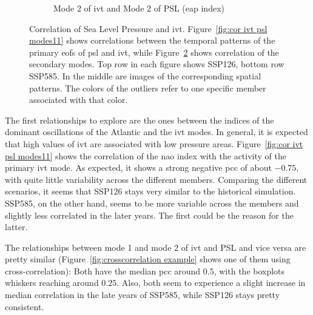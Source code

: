 \begin{figure}[!htbp]
\begin{subfigure}[b]{0.95\textwidth}
    \caption{Mode 2 of \ac{ivt} and Mode 2 of PSL (\ac{eap} index)}
    \label{fig:cor ivt psl modes22}
  \end{subfigure}
  \caption[Correlation Boxplots of PSL and IVT EOF Modes]{Correlation of Sea Level Pressure and \ac{ivt}. Figure~\ref{fig:cor ivt psl modes11} shows correlations between the temporal patterns of the primary \acp{eof} of \ac{psl} and \ac{ivt}, while Figure~\ref{fig:cor ivt psl modes22} shows correlation of the secondary modes. Top row in each figure shows SSP126, bottom row SSP585. In the middle are images of the corresponding spatial patterns. The colors of the outliers refer to one specific member associated with that color.}
\end{figure}

The first relationships to explore are the ones between the indices of the dominant oscillations of the Atlantic and the \ac{ivt} modes. 
In general, it is expected that high values of \ac{ivt} are associated with low pressure areas.
Figure~\ref{fig:cor ivt psl modes11} shows the correlation of the \ac{nao} index with the activity of the primary \ac{ivt} mode. 
As expected, it shows a strong negative \ac{pcc} of about $-0.75$, with quite little variability across the different members. 
Comparing the different scenarios, it seems that SSP126 stays very similar to the historical simulation. 
SSP585, on the other hand, seems to be more variable across the members and slightly less correlated in the later years. The first could be the reason for the latter. 

%

The relationships between mode 1 and mode 2 of \ac{ivt} and PSL and vice versa are pretty similar (Figure~\ref{fig:crosscorrelation example} shows one of them using cross-correlation): 
Both have the median \ac{pcc} around $0.5$, with the boxplots whiskers reaching around $0.25$. 
Also, both seem to experience a slight increase in median correlation in the late years of SSP585, while SSP126 stays pretty consistent. 





